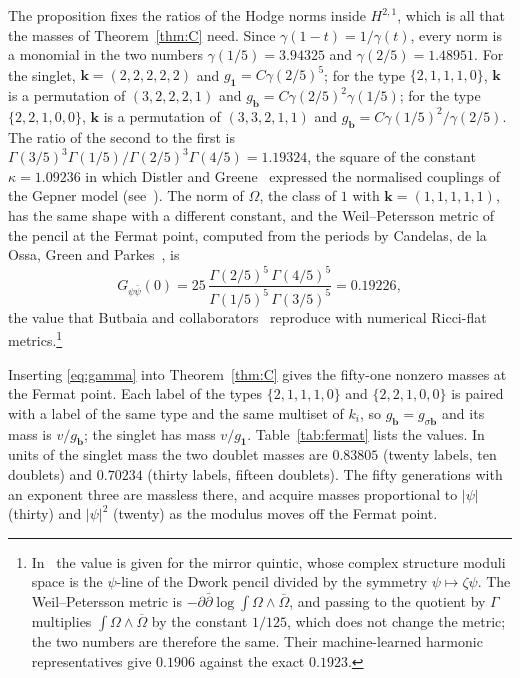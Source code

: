 \documentclass[11pt]{amsart}
\theoremstyle{definition}
\theoremstyle{remark}
\newcommand{\bb}{\mathbf{b}}
\newcommand{\one}{\mathbf{1}}
\begin{document}
The proposition fixes the ratios of the Hodge norms inside $H^{2,1}$, which
is all that the masses of Theorem~\ref{thm:C} need. Since $\gamma(1-t)=
1/\gamma(t)$, every norm is a monomial in the two numbers
$\gamma(1/5)=3.94325$ and $\gamma(2/5)=1.48951$. For the singlet,
$\mathbf k=(2,2,2,2,2)$ and $g_{\one}=C\gamma(2/5)^5$; for the type
$\{2,1,1,1,0\}$, $\mathbf k$ is a permutation of $(3,2,2,2,1)$ and
$g_{\bb}=C\gamma(2/5)^2\gamma(1/5)$; for the type $\{2,2,1,0,0\}$,
$\mathbf k$ is a permutation of $(3,3,2,1,1)$ and $g_{\bb}=C\gamma(1/5)^2/
\gamma(2/5)$. The ratio of the second to the first is
$\Gamma(3/5)^3\Gamma(1/5)/\Gamma(2/5)^3\Gamma(4/5)=1.19324$, the square of
the constant $\kappa=1.09236$ in which Distler and Greene~\cite{DG88}
expressed the normalised couplings of the Gepner model
(see~\cite[eq.~(4.3)]{BMT24}). The norm of $\Omega$, the class of $1$ with
$\mathbf k=(1,1,1,1,1)$, has the same shape with a different constant, and
the Weil--Petersson metric of the pencil at the Fermat point, computed from
the periods by Candelas, de la Ossa, Green and Parkes~\cite{CDGP91}, is
\[
G_{\psi\bar\psi}(0)=25\,\frac{\Gamma(2/5)^5\,\Gamma(4/5)^5}
{\Gamma(1/5)^5\,\Gamma(3/5)^5}=0.19226,
\]
the value that Butbaia and collaborators~\cite{BMT24} reproduce with
numerical Ricci-flat metrics.\footnote{In~\cite{BMT24} the value is given
for the mirror quintic, whose complex structure moduli space is the
$\psi$-line of the Dwork pencil divided by the symmetry
$\psi\mapsto\zeta\psi$. The Weil--Petersson metric is
$-\partial\bar\partial\log\int\Omega\wedge\overline\Omega$, and passing to
the quotient by $\Gamma$ multiplies $\int\Omega\wedge\overline\Omega$ by the
constant $1/125$, which does not change the metric; the two numbers are
therefore the same. Their machine-learned harmonic representatives give
$0.1906$ against the exact $0.1923$.}

Inserting \eqref{eq:gamma} into Theorem~\ref{thm:C} gives the fifty-one
nonzero masses at the Fermat point. Each label of the types
$\{2,1,1,1,0\}$ and $\{2,2,1,0,0\}$ is paired with a label of the same type
and the same multiset of $k_i$, so $g_{\bb}=g_{\sigma\bb}$ and its mass is
$v/g_{\bb}$; the singlet has mass $v/g_{\one}$. Table~\ref{tab:fermat} lists
the values. In units of the singlet mass the two doublet masses are
$0.83805$ (twenty labels, ten doublets) and $0.70234$ (thirty labels,
fifteen doublets). The fifty generations with an exponent three are
massless there, and acquire masses proportional to $|\psi|$ (thirty) and
$|\psi|^2$ (twenty) as the modulus moves off the Fermat point.
\end{document}
